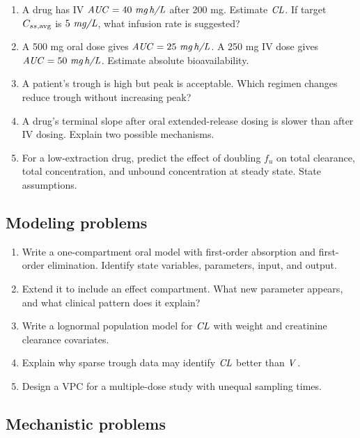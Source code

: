 \begin{enumerate}[leftmargin=2em]
  \item A drug has IV \(\pkAUC=40\ \pksym{mg\,h/L}\) after 200 mg. Estimate \(\pkCL\). If target \(C_{ss,\mathrm{avg}}\) is \(5\ \pksym{mg/L}\), what infusion rate is suggested?
  \item A 500 mg oral dose gives \(\pkAUC=25\ \pksym{mg\,h/L}\). A 250 mg IV dose gives \(\pkAUC=50\ \pksym{mg\,h/L}\). Estimate absolute bioavailability.
  \item A patient's trough is high but peak is acceptable. Which regimen changes reduce trough without increasing peak?
  \item A drug's terminal slope after oral extended-release dosing is slower than after IV dosing. Explain two possible mechanisms.
  \item For a low-extraction drug, predict the effect of doubling \(f_u\) on total clearance, total concentration, and unbound concentration at steady state. State assumptions.
\end{enumerate}

\subsection{Modeling problems}

\begin{enumerate}[leftmargin=2em]
  \item Write a one-compartment oral model with first-order absorption and first-order elimination. Identify state variables, parameters, input, and output.
  \item Extend it to include an effect compartment. What new parameter appears, and what clinical pattern does it explain?
  \item Write a lognormal population model for \(\pkCL\) with weight and creatinine clearance covariates.
  \item Explain why sparse trough data may identify \(\pkCL\) better than \(\pkV\).
  \item Design a VPC for a multiple-dose study with unequal sampling times.
\end{enumerate}

\subsection{Mechanistic problems}

